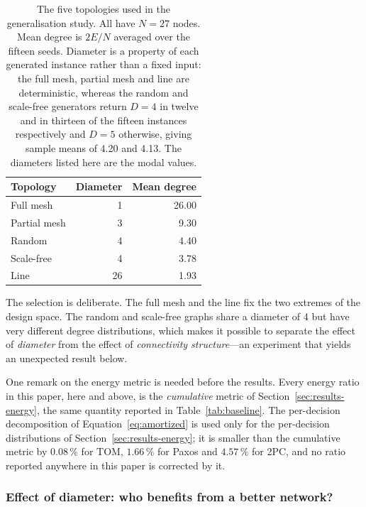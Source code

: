 \documentclass[journal]{IEEEtran}
\newcommand{\Nnodes}{N}                   %
\newcommand{\Diam}{D}                     %
\begin{document}
\begin{table}[!t]
\caption{The five topologies used in the generalisation study. All have
$\Nnodes = 27$ nodes. Mean degree is $2E/\Nnodes$ averaged over the fifteen
seeds. Diameter is a property of each generated instance rather than a fixed
input: the full mesh, partial mesh and line are deterministic, whereas the
random and scale-free generators return $\Diam = 4$ in twelve and in thirteen
of the fifteen instances respectively and $\Diam = 5$ otherwise, giving sample
means of 4.20 and 4.13. The diameters listed here are the modal values.}
\label{tab:topologies}
\centering
\footnotesize
\begin{tabular}{@{}lrr@{}}
\toprule
\textbf{Topology} & \textbf{Diameter} & \textbf{Mean degree} \\
\midrule
Full mesh    & 1  & 26.00 \\
Partial mesh & 3  & 9.30 \\
Random       & 4  & 4.40 \\
Scale-free   & 4  & 3.78 \\
Line         & 26 & 1.93 \\
\bottomrule
\end{tabular}
\end{table}

The selection is deliberate. The full mesh and the line fix the two
extremes of the design space. The random and scale-free graphs share a
diameter of 4 but have very different degree distributions, which makes it
possible to separate the effect of \emph{diameter} from the effect of
\emph{connectivity structure}---an experiment that yields an unexpected
result below.

One remark on the energy metric is needed before the results. Every energy
ratio in this paper, here and above, is the \emph{cumulative} metric of
Section~\ref{sec:results-energy}, the same quantity reported in
Table~\ref{tab:baseline}. The per-decision decomposition of
Equation~\eqref{eq:amortized} is used only for the per-decision
distributions of Section~\ref{sec:results-energy}; it is smaller than the cumulative
metric by $0.08\,\%$ for TOM, $1.66\,\%$ for Paxos and $4.57\,\%$ for 2PC,
and no ratio reported anywhere in this paper is corrected by it.

\subsubsection{Effect of diameter: who benefits from a better network?}
\end{document}
